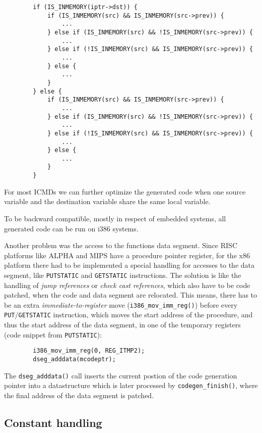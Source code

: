 \begin{verbatim}
        if (IS_INMEMORY(iptr->dst)) {
            if (IS_INMEMORY(src) && IS_INMEMORY(src->prev)) {
                ...
            } else if (IS_INMEMORY(src) && !IS_INMEMORY(src->prev)) {
                ...
            } else if (!IS_INMEMORY(src) && IS_INMEMORY(src->prev)) {
                ...
            } else {
                ...
            }
        } else {
            if (IS_INMEMORY(src) && IS_INMEMORY(src->prev)) {
                ...
            } else if (IS_INMEMORY(src) && !IS_INMEMORY(src->prev)) {
                ...
            } else if (!IS_INMEMORY(src) && IS_INMEMORY(src->prev)) {
                ...
            } else {
                ...
            }
        }
\end{verbatim}

For most ICMDs we can further optimize the generated code when one
source variable and the destination variable share the same local
variable.

To be backward compatible, mostly in respect of embedded systems, all
generated code can be run on i386 systems.

Another problem was the access to the functions data segment. Since
RISC platforms like ALPHA and MIPS have a procedure pointer register,
for the x86 platform there had to be implemented a special handling
for accesses to the data segment, like \texttt{PUTSTATIC} and
\texttt{GETSTATIC} instructions. The solution is like the handling of
\textit{jump references} or \textit{check cast references}, which also
have to be code patched, when the code and data segment are
relocated. This means, there has to be an extra
\textit{immediate-to-register} move (\texttt{i386\_mov\_imm\_reg()})
before every \texttt{PUT}/\texttt{GETSTATIC} instruction, which moves
the start address of the procedure, and thus the start address of the
data segment, in one of the temporary registers (code snippet from
\texttt{PUTSTATIC}):

\begin{verbatim}
        i386_mov_imm_reg(0, REG_ITMP2);
        dseg_adddata(mcodeptr);
\end{verbatim}

The \texttt{dseg\_adddata()} call inserts the current postion of the
code generation pointer into a datastructure which is later processed
by \texttt{codegen\_finish()}, where the final address of the data
segment is patched.


\subsection{Constant handling}

